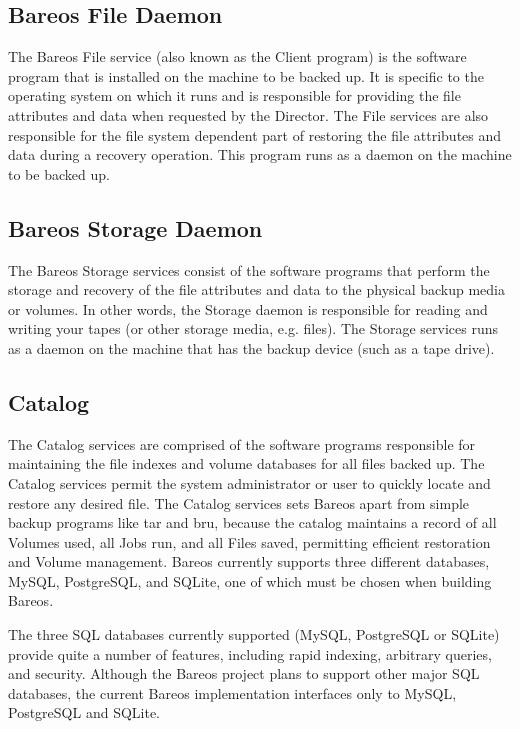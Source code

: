 \subsection*{Bareos File Daemon}
   \label{FDDef}
   The Bareos File service (also known as the Client program) is the software
   program that is installed on the machine to be backed up.
   It is specific to the
   operating system on which it runs and is responsible for providing the
   file attributes and data when requested by the Director.  The File
   services are also responsible for the file system dependent part of
   restoring the file attributes and data during a recovery operation.
   This program runs as a daemon on the machine to be backed up.

\subsection*{Bareos Storage Daemon}
   \label{SDDef}
   The Bareos Storage services consist of the software programs that
   perform the storage and recovery of the file attributes and data to the
   physical backup media or volumes.  In other words, the Storage daemon is
   responsible for reading and writing your tapes (or other storage media,
   e.g.  files). The Storage services runs as
   a daemon on the machine that has the backup device (such as a tape
   drive).

\subsection*{Catalog}
   \label{DBDefinition}
   The Catalog services are comprised of the software programs
   responsible for maintaining the file indexes and volume databases for
   all files backed up.  The Catalog services permit the system
   administrator or user to quickly locate and restore any desired file.
   The Catalog services sets Bareos apart from simple backup programs like
   tar and bru, because the catalog maintains a record of all Volumes used,
   all Jobs run, and all Files saved, permitting efficient restoration and
   Volume management.  Bareos currently supports three different databases,
   MySQL, PostgreSQL, and SQLite, one of which must be chosen when building
   Bareos.

   The three SQL databases currently supported (MySQL, PostgreSQL or
   SQLite) provide quite a number of features, including rapid indexing,
   arbitrary queries, and security.  Although the Bareos project plans to support other
   major SQL databases, the current Bareos implementation interfaces only
   to MySQL, PostgreSQL and SQLite.

